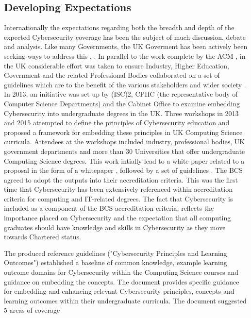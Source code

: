 \documentclass[sigconf,anonymous]{acmart}
\begin{document}
\subsection{Developing Expectations}
Internationally the expectations regarding both the breadth and depth of the expected Cybersecurity coverage has been the subject of much discussion, debate and analysis. Like many Governments, the UK Goverment has been actively been seeking ways to address this \cite{UKCabinetOffice}, \cite{UKCabinetOffice2014}. In parallel to the work complete by the ACM \cite{ACM2013a}, in the UK considerable effort was taken to ensure Industry, Higher Education, Government and the related Professional Bodies collaborated on a set of guidelines which are to the benefit of the various stakeholders and wider society \cite{Irons2016}. In 2013, an initiative was set up by (ISC)2, CPHC (the representative body of Computer Science Departments) and the Cabinet Office to examine embedding Cybersecurity into undergraduate degrees in the UK. Three workshops in 2013 and 2015 attempted to define the principles of Cybersecurity education and proposed a framework for embedding these principles in UK Computing Science curricula. Attendees at the workshops included industry, professional bodies, UK government departments and more than 30 Universities that offer undergraduate Computing Science degrees. This work intially lead to a white paper related to a proposal in the form of a whitepaper \cite{CPHCISC2014}, followed by a set of guidelines \cite{CPHCISC2}. The BCS agreed to adopt the outputs into their accreditation criteria. This was the first time that Cybersecurity has been extensively referenced within accreditation criteria for computing and IT-related degrees. The fact that Cybersecurity is included as a  component of the BCS accreditation criteria, reflects the importance placed on Cybersecurity and the expectation that all computing graduates should have knowledge and skills in Cybersecurity as they move towards Chartered status.

The produced reference guidelines ("Cybersecurity Principles and Learning Outcomes") \cite{CPHCISC2} established a baseline of common knowledge, example learning outcome domains for Cybersecurity within the Computing Science courses and guidance on embedding the concepts. The document provides specific guidance for embedding and enhancing relevant Cybersecurity principles, concepts and learning outcomes within their undergraduate curricula. The document suggested 5 areas of coverage 
\end{document}
